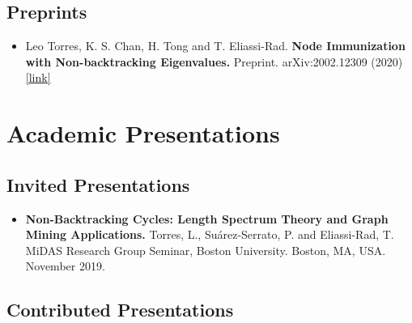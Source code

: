 \documentclass[12pt,]{scrartcl}
\begin{document}
\subsection{Preprints}\label{preprints}

\begin{itemize}
\leftskip-0.25in %

\item Leo Torres, K. S. Chan, H. Tong and T. Eliassi-Rad. \textbf{Node Immunization with Non-backtracking Eigenvalues.} Preprint. arXiv:2002.12309 (2020) \href{https://arxiv.org/abs/2002.12309}{[link]}

\end{itemize}


\section{Academic Presentations}\label{presentations}

\subsection{Invited Presentations}\label{invited-presentations}

\begin{itemize}
\leftskip-0.25in %

\item \textbf{Non-Backtracking Cycles: Length Spectrum Theory and Graph Mining Applications.} Torres, L., Su\'arez-Serrato, P. and Eliassi-Rad, T. MiDAS Research Group Seminar, Boston University. Boston, MA, USA. November 2019.

\end{itemize}

\subsection{Contributed Presentations}\label{contributed-presentations}
\end{document}
